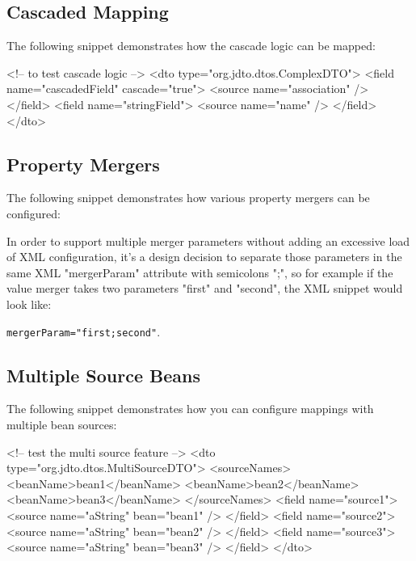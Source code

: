 \documentclass[11pt]{article}
\begin{document}
\subsection{Cascaded Mapping}

The following snippet demonstrates how the cascade logic can be mapped:

\begin{xml}
<!-- to test cascade logic -->
<dto type="org.jdto.dtos.ComplexDTO">
    <field name="cascadedField" cascade="true">
        <source name="association" />
    </field>
    <field name="stringField">
        <source name="name" />
    </field>
</dto>
\end{xml}


\subsection{Property Mergers}

The following snippet demonstrates how various property mergers can be configured:


In order to support multiple merger parameters without adding an excessive load of XML configuration, it's a design decision to separate those parameters in the same XML "mergerParam" attribute with semicolons ";", so for example if the value merger takes two parameters "first" and "second", the XML snippet would look like:

\texttt{mergerParam="first;second"}.

\subsection{Multiple Source Beans}

The following snippet demonstrates how you can configure mappings with multiple bean sources:

\begin{xml}
<!-- test the multi source feature -->
<dto type="org.jdto.dtos.MultiSourceDTO">
    <sourceNames>
        <beanName>bean1</beanName>
        <beanName>bean2</beanName>
        <beanName>bean3</beanName>
    </sourceNames>
    <field name="source1">
        <source name="aString" bean="bean1" />
    </field>
    <field name="source2">
        <source name="aString" bean="bean2" />
    </field>
    <field name="source3">
        <source name="aString" bean="bean3" />
    </field>
</dto> 
\end{xml}
\end{document}
